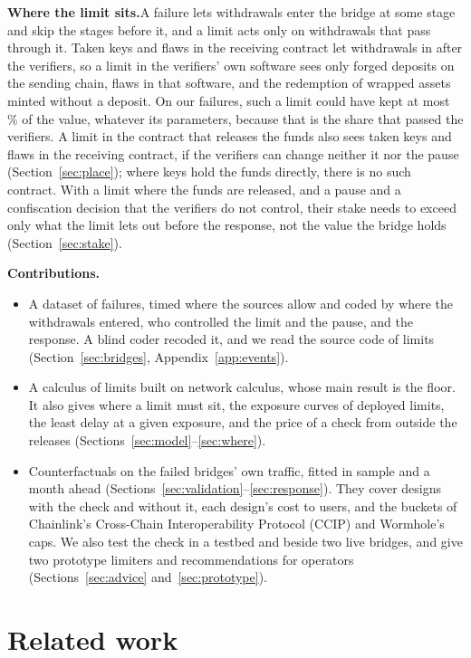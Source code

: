 \documentclass[conference,compsoc]{IEEEtran}
\numberwithin{equation}{section}
\theoremstyle{plain}
\theoremstyle{definition}
\theoremstyle{remark}
\newcommand{\runin}[1]{\par\smallskip\noindent\textbf{#1.}\enspace}
\begin{document}
\runin{Where the limit sits}A failure lets withdrawals enter the bridge at some stage and skip the stages before it, and a limit acts only on withdrawals that pass through it. Taken keys and flaws in the receiving contract let withdrawals in after the verifiers, so a limit in the verifiers' own software sees only forged deposits on the sending chain, flaws in that software, and the redemption of wrapped assets minted without a deposit. On our failures, such a limit could have kept at most \verifierMaxPct\% of the value, whatever its parameters, because that is the share that passed the verifiers. A limit in the contract that releases the funds also sees taken keys and flaws in the receiving contract, if the verifiers can change neither it nor the pause (Section~\ref{sec:place}); where keys hold the funds directly, there is no such contract. With a limit where the funds are released, and a pause and a confiscation decision that the verifiers do not control, their stake needs to exceed only what the limit lets out before the response, not the value the bridge holds (Section~\ref{sec:stake}).

\runin{Contributions}\begin{itemize}
\item A dataset of \nEvents{} failures, timed where the sources allow and coded by where the withdrawals entered, who controlled the limit and the pause, and the response. A blind coder recoded it, and we read the source code of \nRules{} limits (Section~\ref{sec:bridges}, Appendix~\ref{app:events}).
\item A calculus of limits built on network calculus, whose main result is the floor. It also gives where a limit must sit, the exposure curves of deployed limits, the least delay at a given exposure, and the price of a check from outside the releases (Sections~\ref{sec:model}--\ref{sec:where}).
\item Counterfactuals on the failed bridges' own traffic, fitted in sample and a month ahead (Sections~\ref{sec:validation}--\ref{sec:response}). They cover designs with the check and without it, each design's cost to users, and the buckets of Chainlink's Cross-Chain Interoperability Protocol (CCIP) and Wormhole's caps. We also test the check in a testbed and beside two live bridges, and give two prototype limiters and recommendations for operators (Sections~\ref{sec:advice} and~\ref{sec:prototype}).
\end{itemize}

\section{Related work}\label{sec:related}
\end{document}
